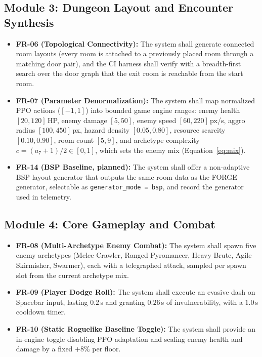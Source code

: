 \subsection{Module 3: Dungeon Layout and Encounter Synthesis}
\begin{itemize}
    \item \textbf{FR-06 (Topological Connectivity):} The system shall generate connected room layouts (every room is attached to a previously placed room through a matching door pair), and the CI harness shall verify with a breadth-first search over the door graph that the exit room is reachable from the start room.
    \item \textbf{FR-07 (Parameter Denormalization):} The system shall map normalized PPO actions ($[-1, 1]$) into bounded game engine ranges: enemy health $[20, 120]$\,HP, enemy damage $[5, 50]$, enemy speed $[60, 220]$\,px/s, aggro radius $[100, 450]$\,px, hazard density $[0.05, 0.80]$, resource scarcity $[0.10, 0.90]$, room count $[5, 9]$, and archetype complexity $c = (a_7+1)/2 \in [0,1]$, which sets the enemy mix (Equation~\ref{eq:mix}).
    \item \textbf{FR-14 (BSP Baseline, planned):} The system shall offer a non-adaptive BSP layout generator that outputs the same room data as the FORGE generator, selectable as \texttt{generator\_mode = bsp}, and record the generator used in telemetry.
\end{itemize}

\subsection{Module 4: Core Gameplay and Combat}
\begin{itemize}
    \item \textbf{FR-08 (Multi-Archetype Enemy Combat):} The system shall spawn five enemy archetypes (Melee Crawler, Ranged Pyromancer, Heavy Brute, Agile Skirmisher, Swarmer), each with a telegraphed attack, sampled per spawn slot from the current archetype mix.
    \item \textbf{FR-09 (Player Dodge Roll):} The system shall execute an evasive dash on Spacebar input, lasting $0.2$\,s and granting $0.26$\,s of invulnerability, with a $1.0$\,s cooldown timer.
    \item \textbf{FR-10 (Static Roguelike Baseline Toggle):} The system shall provide an in-engine toggle disabling PPO adaptation and scaling enemy health and damage by a fixed $+8\%$ per floor.
\end{itemize}

